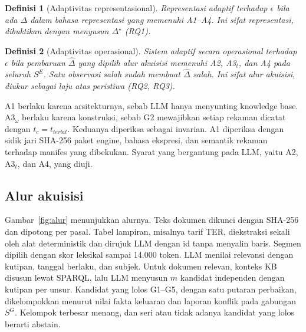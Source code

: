 \documentclass[journal,a4paper]{IEEEtran}
\makeatletter
\DeclareRobustCommand{\en}[1]{{\usefont{\f@encoding}{\f@family}{\f@series}{it}#1\/}}
\newtheorem{definisi}{Definisi}
\newcommand{\emas}{\star}
\newcommand{\SG}{S^{G}}
\newcommand{\SE}{S^{E}}
\makeatother
\begin{document}
\begin{definisi}[Adaptivitas representasional]
\label{def:adapt-rep}
Representasi adaptif terhadap $\epsilon$ bila \emph{ada} $\Delta$ dalam bahasa representasi yang memenuhi A1--A4. Ini sifat representasi, dibuktikan dengan menyusun $\Delta^{\emas}$ (RQ1).
\end{definisi}

\begin{definisi}[Adaptivitas operasional]
\label{def:adapt-op}
Sistem adaptif secara operasional terhadap $\epsilon$ bila pembaruan $\hat{\Delta}$ yang \emph{dipilih alur akuisisi} memenuhi A2, A3$_t$, dan A4 pada seluruh $\SE$. Satu observasi salah sudah membuat $\hat{\Delta}$ salah. Ini sifat alur akuisisi, diukur sebagai laju atas peristiwa (RQ2, RQ3).
\end{definisi}

A1 berlaku karena arsitekturnya, sebab LLM hanya menyunting \en{knowledge base}. A3$_\omega$ berlaku karena konstruksi, sebab G2 mewajibkan setiap rekaman dicatat dengan $t_c = t_{\mathit{terbit}}$. Keduanya diperiksa sebagai invarian. A1 diperiksa dengan sidik jari SHA-256 paket \en{engine}, bahasa ekspresi, dan semantik rekaman terhadap manifes yang dibekukan. Syarat yang bergantung pada LLM, yaitu A2, A3$_t$, dan A4, yang diuji.

\subsection{Alur akuisisi}
Gambar~\ref{fig:alur} menunjukkan alurnya. Teks dokumen dikunci dengan SHA-256 dan dipotong per pasal. Tabel lampiran, misalnya tarif TER, diekstraksi sekali oleh alat deterministik dan dirujuk LLM dengan id tanpa menyalin baris. Segmen dipilih dengan skor leksikal sampai 14.000 token. LLM menilai relevansi dengan kutipan, tanggal berlaku, dan subjek. Untuk dokumen relevan, konteks KB disusun lewat SPARQL, lalu LLM menyusun $m$ kandidat independen dengan kutipan per unsur. Kandidat yang lolos G1--G5, dengan satu putaran perbaikan, dikelompokkan menurut nilai fakta keluaran dan laporan konflik pada gabungan $\SG$. Kelompok terbesar menang, dan seri atau tidak adanya kandidat yang lolos berarti \en{abstain}.
\end{document}
